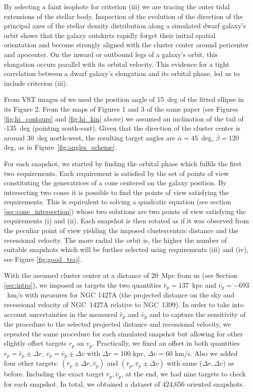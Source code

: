 By selecting a faint isophote for criterion (iii) we are tracing the outer tidal extensions of the stellar body.
Inspection of the evolution of the direction of the principal axes of the stellar density distribution along a simulated dwarf galaxy's orbit shows that the galaxy outskirts rapidly forget their initial spatial orientation and become strongly aligned with the cluster center around pericenter and apocenter. On the inward or outbound legs of a galaxy's orbit, this elongation occurs parallel with its orbital velocity. This evidence for a tight correlation between a dwarf galaxy's elongation and its orbital phase, led us to include criterion (iii).

From VST images of \citet[][]{Lee-Waddell2018} \citep[originally from the deep survey presented in][]{Iodice2016} we used the position angle of 15~deg of the fitted ellipse in its Figure 2.
From the \Hi{} maps of Figures 1 and 3 of the same paper (see Figures \ref{fig:hi_contours} and \ref{fig:hi_kin} above) we assumed an inclination of the \Hi{} tail of -135~deg (pointing south-east).
Given that the direction of the cluster center is around 30~deg north-west, the resulting target angles are $\bar \alpha = 45$~deg, $\bar \beta = 120$ deg, as in Figure~\ref{fig:angles_scheme}.

For each snapshot, we started by finding the orbital phase which fulfils the first two requirements.
Each requirement is satisfied by the set of points of view constituting the generatrices of a cone centered on the galaxy position.
By intersecting two cones it is possible to find the points of view satisfying the requirements.
This is equivalent to solving a quadratic equation (see section \ref{sec:cone_intersection}) whose two solutions are two points of view satisfying the requirements (i) and (ii).
Each snapshot is then rotated as if it was observed from the peculiar point of view yielding the imposed clustercentric distance and the recessional velocity.
The more radial the orbit is, the higher the number of suitable snapshots which will be further selected using requirements (iii) and (iv), see Figure \ref{fig:good_traj}.

With the assumed cluster center at a distance of 20~Mpc from us (see Section \ref{sec:intro}), we imposed as targets the two quantities $\bar r_p=137$~kpc and $\bar v_p=-693$~km/s with measures for NGC 1427A (the projected distance on the sky and recessional velocity of NGC~1427A relative to NGC~1399).
In order to take into account uncertainties in the measured $\bar r_p$ and $\bar v_p$ and to capture the sensitivity of the procedure to the selected projected distance and recessional velocity, we repeated the same procedure for each simulated snapshot but allowing for other slightly offset targets $r_p$ an $v_p$.
Practically, we fixed an offset in both quantities $r_p = \bar r_p \pm \Delta r$, $v_p = \bar v_p \pm \Delta v$ with $\Delta r = 100$ kpc, $\Delta v = 60$ km/s.
Also we added four other targets: $(\bar r_p \pm \Delta r, \bar v_p)$ and $(\bar r_p, \bar v_p \pm \Delta v)$ with same ($\Delta r, \Delta v$) as before.
Including the exact target $\bar r_p, \bar v_p$, at the end, we had nine targets to check for each snapshot.
In total, we obtained a dataset of 424,656 oriented snapshots.

